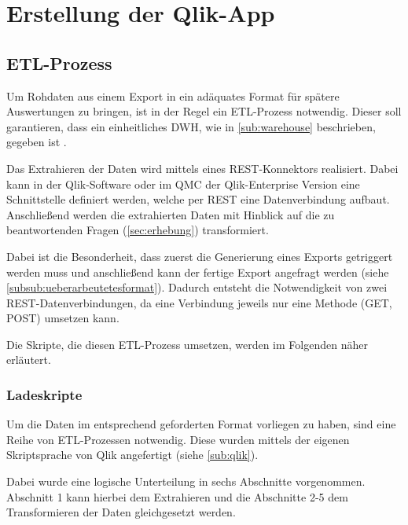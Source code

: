 \section{Erstellung der Qlik-App}
\label{sec:erstellung}
\subsection{ETL-Prozess}
\label{sub:etl}
Um Rohdaten aus einem Export in ein adäquates Format für spätere Auswertungen zu bringen, ist in der Regel ein \gls{ETL}-Prozess notwendig.
Dieser soll garantieren, dass ein einheitliches \gls{DWH}, wie in \ref{sub:warehouse} beschrieben, gegeben ist \cite[S.49]{Gabriel.2011}.

Das Extrahieren der Daten wird mittels eines \gls{REST}-Konnektors realisiert.
Dabei kann in der Qlik-Software oder im \gls{QMC} der Qlik-Enterprise Version eine Schnittstelle definiert werden, welche per REST eine Datenverbindung aufbaut.
Anschließend werden die extrahierten Daten mit Hinblick auf die zu beantwortenden Fragen (\ref{sec:erhebung}) transformiert.

Dabei ist die Besonderheit, dass zuerst die Generierung eines Exports getriggert werden muss und anschließend kann der fertige Export angefragt werden (siehe \ref{subsub:ueberarbeutetesformat}).
Dadurch entsteht die Notwendigkeit von zwei REST-Datenverbindungen, da eine Verbindung jeweils nur eine Methode (GET, POST) umsetzen kann.

Die Skripte, die diesen ETL-Prozess umsetzen, werden im Folgenden näher erläutert.

\subsubsection{Ladeskripte}
\label{subsub:scripts}

Um die Daten im entsprechend geforderten Format vorliegen zu haben, sind eine Reihe von \gls{ETL}-Prozessen notwendig.
Diese wurden mittels der eigenen Skriptsprache von Qlik angefertigt (siehe \ref{sub:qlik}).

Dabei wurde eine logische Unterteilung in sechs Abschnitte vorgenommen.
Abschnitt 1 kann hierbei dem Extrahieren und die Abschnitte 2-5 dem Transformieren der Daten gleichgesetzt werden.


